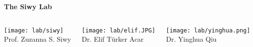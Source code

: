 \begin{frame}[c]{}


	
\end{frame}







\begin{frame}[c]{}
	
	{\centering
		{\Large \textcolor{uciblue0}{\textbf{The Siwy Lab}}} \\
		\par
	}
	
	\vspace{-.3in}
	
	\begin{columns}[t]
		
		
		\begin{column}[T]{3.5in}
			
			\vspace{.35in}
			
			\begin{columns}[t]
				\begin{column}[T]{1in}
					{\centering
						\texttt{[image: lab/siwy]} \\
						\vspace{-.1in}
						{\tiny Prof. Zuzanna S. Siwy} \\
						\par
					}
				\end{column}
			
				\begin{column}[T]{1in}
					{\centering
						\texttt{[image: lab/elif.JPG]} \\
						\vspace{-.1in}
						{\tiny Dr. Elif T{\"u}rker Acar} \\
						\par
					}
				\end{column}
			
				\begin{column}[T]{1in}
					{\centering
						\texttt{[image: lab/yinghua.png]} \\
						\vspace{-.1in}
						{\tiny Dr. Yinghua Qiu} \\
						\par
					}
				\end{column}
			

\end{columns}
\end{column}
\end{columns}
\end{frame}
